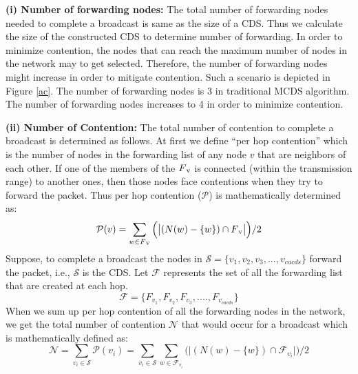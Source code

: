  \textbf{ (i) Number of forwarding nodes:} The total number of forwarding nodes needed to complete a broadcast is same  as the size of a CDS. Thus we calculate the size of the constructed CDS to determine number of forwarding. In order to minimize contention, the nodes that can reach the maximum number of nodes in the network may to get selected. Therefore, the number of forwarding nodes might increase in order to mitigate contention.  Such a scenario is depicted in Figure \ref{ac}. The number of forwarding nodes is 3 in traditional MCDS algorithm. The number of forwarding nodes increases to 4 in order to minimize contention.

  \textbf{ (ii) Number of Contention:} The total number of contention to complete a broadcast is determined as follows. At first we define ``per hop contention'' which is the number of nodes in the forwarding list of any node $v$ that are neighbors of each other. If one of the members of the $F\textsubscript{v}$ is connected (within the transmission range) to another ones, then those nodes face contentions when they try to forward the packet. Thus per hop contention  ($\mathcal{P}$) is mathematically determined as:  
  $$  \mathcal{P}(v) = \sum_{w \in F\textsubscript{v}} \Big(\big|(N(w)-\{w\}) \cap F\textsubscript{v}\big|\Big)/2$$
Suppose, to complete a broadcast the nodes in $\mathcal{S} = \{v_1,v_2,v_3, ... , v_{cacds}\}$ forward the packet, i.e., $\mathcal{S}$ is the CDS. Let $\mathcal{F}$ represents the set of all the forwarding list that are created at each hop. $$\mathcal{F} =  \{F_{v_1},F_{v_2},F_{v_3},....,F_{v_{cacds}} \}$$
 When we sum up per hop contention of all the forwarding nodes in the network, we get the total number of contention $\mathcal{N}$ that would occur for a broadcast which is mathematically defined as: 
$$  \mathcal{N} = \sum_{v_i \in \mathcal{S}} \mathcal{P}(v_i)= \sum_{v_i \in \mathcal{S}} \sum_{w \in \mathcal{F}_{v_i}}\Big(\big|(N(w)-\{w\}) \cap \mathcal{F}_{v_i}\big|\Big)/2 $$

